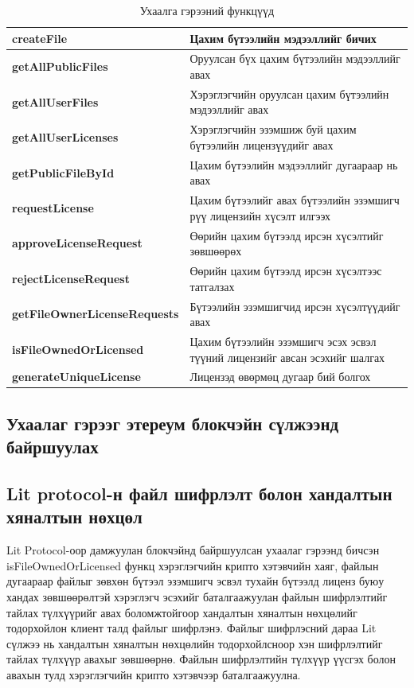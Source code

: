 \begin{table}[h!]
	\centering
   \begin{tabularx}{\textwidth}{|p{}|X|}
		\hline
		 \textbf{createFile}& Цахим бүтээлийн мэдээллийг бичих
	\\ \hline \textbf{getAllPublicFiles} & Оруулсан бүх цахим бүтээлийн мэдээллийг авах
	\\ \hline \textbf{getAllUserFiles} &  Хэрэглэгчийн оруулсан цахим бүтээлийн мэдээллийг авах
	\\ \hline \textbf{getAllUserLicenses} & Хэрэглэгчийн эзэмшиж буй цахим бүтээлийн лицензүүдийг авах
	\\ \hline \textbf{getPublicFileById} & Цахим бүтээлийн мэдээллийг дугаараар нь авах
	\\ \hline \textbf{requestLicense} & Цахим бүтээлийг авах бүтээлийн эзэмшигч рүү лицензийн хүсэлт илгээх
	\\ \hline \textbf{approveLicenseRequest} & Өөрийн цахим бүтээлд ирсэн хүсэлтийг зөвшөөрөх
	\\ \hline \textbf{rejectLicenseRequest} & Өөрийн цахим бүтээлд ирсэн хүсэлтээс татгалзах
	\\ \hline \textbf{getFileOwnerLicenseRequests} & Бүтээлийн эзэмшигчид ирсэн хүсэлтүүдийг авах
	\\ \hline \textbf{isFileOwnedOrLicensed} & Цахим бүтээлийн эзэмшигч эсэх эсвэл түүний лицензийг авсан эсэхийг шалгах
	\\ \hline \textbf{generateUniqueLicense} & Лицензэд өвөрмөц дугаар бий болгох                                                             \\ \hline
	\end{tabularx}
   \caption{Ухаалга гэрээний функцүүд}
\end{table}

\newpage
\subsection{Ухаалаг гэрээг этереум блокчэйн сүлжээнд байршуулах}


\subsection{Lit protocol-н файл шифрлэлт болон хандалтын хяналтын нөхцөл}
Lit Protocol-оор дамжуулан блокчэйнд байршуулсан ухаалаг гэрээнд бичсэн isFileOwnedOrLicensed функц хэрэглэгчийн крипто хэтэвчийн хаяг, файлын дугаараар файлыг зөвхөн бүтээл эзэмшигч эсвэл тухайн бүтээлд лиценз буюу хандах зөвшөөрөлтэй хэрэглэгч эсэхийг баталгаажуулан файлын шифрлэлтийг тайлах түлхүүрийг авах боломжтойгоор хандалтын хяналтын нөхцөлийг тодорхойлон клиент талд файлыг шифрлэнэ. Файлыг шифрлэсний дараа Lit сүлжээ нь хандалтын хяналтын нөхцөлийн тодорхойлсноор хэн шифрлэлтийг тайлах түлхүүр авахыг зөвшөөрнө. Файлын шифрлэлтийн түлхүүр үүсгэх болон авахын тулд хэрэглэгчийн крипто хэтэвчээр баталгаажуулна.

